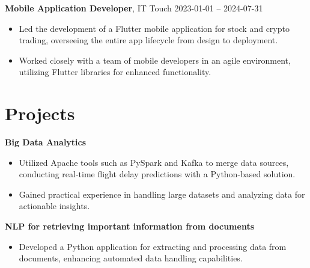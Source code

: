 \documentclass[10pt, letterpaper]{article}
\begin{document}
\begin{paracol}{2}
\noindent\textbf{Mobile Application Developer}, IT Touch \switchcolumn
\hfill 2023-01-01 -- 2024-07-31
\end{paracol}

\vspace{5pt}

\begin{itemize}
    
    \item Led the development of a Flutter mobile application for stock and crypto trading, overseeing the entire app lifecycle from design to deployment.
    
    \item Worked closely with a team of mobile developers in an agile environment, utilizing Flutter libraries for enhanced functionality.
    
\end{itemize}


\section*{Projects}

\noindent\textbf{Big Data Analytics}

\vspace{5pt}
\begin{itemize}
    
    \item Utilized Apache tools such as PySpark and Kafka to merge data sources, conducting real-time flight delay predictions with a Python-based solution.
    
    \item Gained practical experience in handling large datasets and analyzing data for actionable insights.
    
\end{itemize}

\noindent\textbf{NLP for retrieving important information from documents}

\vspace{5pt}
\begin{itemize}
    
    \item Developed a Python application for extracting and processing data from documents, enhancing automated data handling capabilities.
    
\end{itemize}
\end{document}
